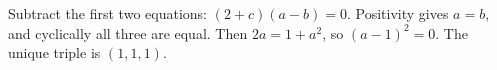 Subtract the first two equations: $(2+c)(a-b)=0 $. Positivity gives $ a=b $, and cyclically all three are equal. Then $ 2a=1+a^2 $, so $(a-1)^2=0 $. The unique triple is $\boxed{(1,1,1)}$.
